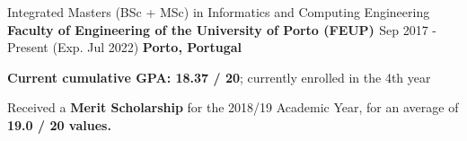 

\begin{cventries}

  \cventry
    {Integrated Masters (BSc + MSc) in Informatics and Computing Engineering} %
    {\textbf{Faculty of Engineering of the University of Porto (FEUP) \href{https://sigarra.up.pt/feup/en/web_page.inicial}{\faExternalLink}}} %
    {Sep 2017 - Present (Exp. Jul 2022)} %
    {\textbf{Porto, Portugal}} %
    {
      \begin{cvitems} %
        \item {\textbf{Current cumulative GPA: 18.37 / 20}; currently enrolled in the 4th year}
        \item {Received a \textbf{Merit Scholarship} for the 2018/19 Academic Year, for an average of \textbf{19.0 / 20 values.}}
      \end{cvitems}
    }

\end{cventries}
